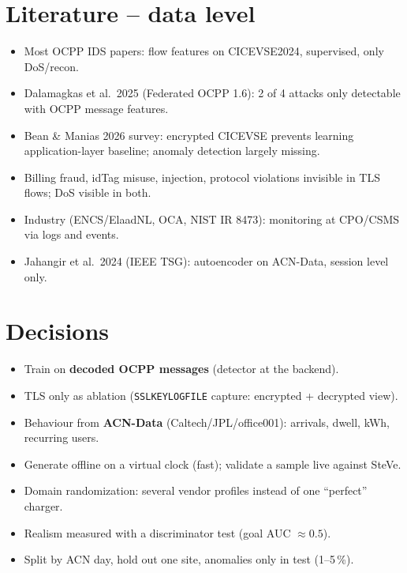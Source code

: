 \documentclass[11pt]{article}
\begin{document}
\section{Literature -- data level}
\begin{itemize}
  \item Most OCPP IDS papers: flow features on CICEVSE2024, supervised, only DoS/recon.
  \item Dalamagkas et al.\ 2025 (Federated OCPP 1.6): 2 of 4 attacks only detectable with OCPP message features.
  \item Bean \& Manias 2026 survey: encrypted CICEVSE prevents learning application-layer baseline; anomaly detection largely missing.
  \item Billing fraud, idTag misuse, injection, protocol violations invisible in TLS flows; DoS visible in both.
  \item Industry (ENCS/ElaadNL, OCA, NIST IR 8473): monitoring at CPO/CSMS via logs and events.
  \item Jahangir et al.\ 2024 (IEEE TSG): autoencoder on ACN-Data, session level only.
\end{itemize}

\section{Decisions}
\begin{itemize}
  \item Train on \textbf{decoded OCPP messages} (detector at the backend).
  \item TLS only as ablation (\texttt{SSLKEYLOGFILE} capture: encrypted + decrypted view).
  \item Behaviour from \textbf{ACN-Data} (Caltech/JPL/office001): arrivals, dwell, kWh, recurring users.
  \item Generate offline on a virtual clock (fast); validate a sample live against SteVe.
  \item Domain randomization: several vendor profiles instead of one ``perfect'' charger.
  \item Realism measured with a discriminator test (goal AUC $\approx 0.5$).
  \item Split by ACN day, hold out one site, anomalies only in test (1--5\,\%).
\end{itemize}
\end{document}
